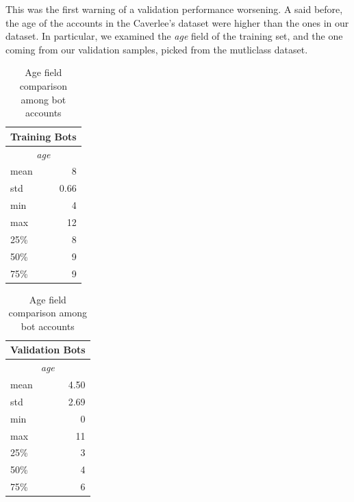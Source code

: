 This was the first warning of a validation performance worsening.
A said before, the age of the accounts in the Caverlee's dataset were higher than the ones in our dataset. In particular, we examined the \textit{age} field of the training set, and the one coming from our validation samples, picked from the mutliclass dataset.
\begin{table}[!htb]
	\caption{Age field comparison among bot accounts}
	\begin{center}
		\begin{tabular}{@{}lr@{}}
			\multicolumn{2}{c}{\textbf{Training Bots}}\\
			\hline\hline
			\multicolumn{2}{c}{\textit{age}}\\
			\hline
			\multicolumn{1}{l}{mean}& \multicolumn{1}{r}{8}\\
			\multicolumn{1}{l}{std}& \multicolumn{1}{r}{0.66}\\
			\multicolumn{1}{l}{min}& \multicolumn{1}{r}{4}\\
			\multicolumn{1}{l}{max}& \multicolumn{1}{r}{12}\\
			\multicolumn{1}{l}{25\%}& \multicolumn{1}{r}{8}\\
			\multicolumn{1}{l}{50\%}& \multicolumn{1}{r}{9}\\
			\multicolumn{1}{l}{75\%}& \multicolumn{1}{r}{9}\\
			\hline\hline
		\end{tabular}
		\begin{tabular}{@{}lr@{}}
			\multicolumn{2}{c}{\textbf{Validation Bots}}\\
			\hline\hline
			\multicolumn{2}{c}{\textit{age}}\\
			\hline
			\multicolumn{1}{l}{mean}& \multicolumn{1}{r}{4.50}\\
			\multicolumn{1}{l}{std}& \multicolumn{1}{r}{2.69}\\
			\multicolumn{1}{l}{min}& \multicolumn{1}{r}{0}\\
			\multicolumn{1}{l}{max}& \multicolumn{1}{r}{11}\\
			\multicolumn{1}{l}{25\%}& \multicolumn{1}{r}{3}\\
			\multicolumn{1}{l}{50\%}& \multicolumn{1}{r}{4}\\
			\multicolumn{1}{l}{75\%}& \multicolumn{1}{r}{6}\\
			\hline\hline
		\end{tabular}
	\end{center}
	\label{table:bots}
\end{table}


